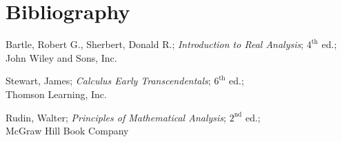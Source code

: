 \section{Bibliography}

\begin{thebibliography}{9}
Bartle, Robert G., Sherbert, Donald R.; \textit{Introduction to Real Analysis}; $4^{\text{th}}$ ed.;\\ John Wiley and Sons, Inc.

Stewart, James; \textit{Calculus Early Transcendentals}; $6^{\text{th}}$ ed.;\\ Thomson Learning, Inc.

Rudin, Walter; \textit{Principles of Mathematical Analysis}; $2^{\text{nd}}$ ed.;\\ McGraw Hill Book Company

\end{thebibliography}